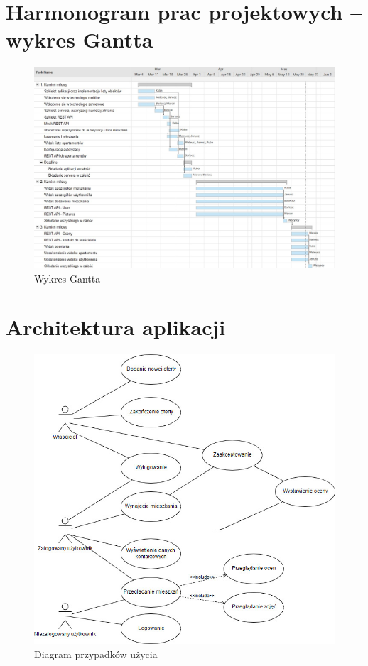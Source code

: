 \documentclass[polish, 11pt]{article}
\begin{document}
\section{Harmonogram prac projektowych – wykres Gantta}
    \begin{figure}[H]
        \centering
        \includegraphics[width=\textwidth]{figures/gantt.jpg}
        \caption{Wykres Gantta}
    \end{figure}
    
\section{Architektura aplikacji}
    \begin{figure}[H]
        \centering
        \includegraphics[width=\textwidth]{figures/UseCase.jpg}
        \caption{Diagram przypadków użycia}
    \end{figure}
    
\end{document}
